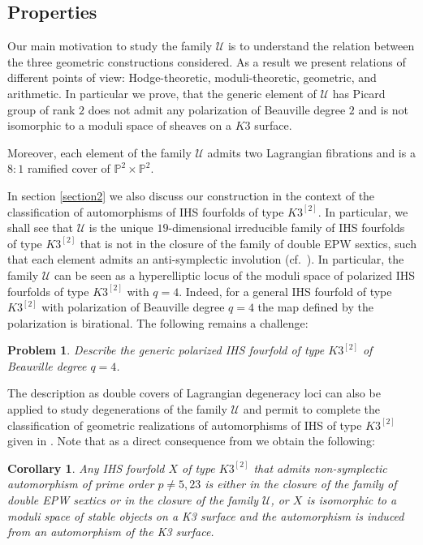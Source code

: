 \documentclass[a4paper,11pt]{amsart}
\newtheorem{cor}[thm]{Corollary}
\newtheorem{prob}[thm]{Problem}
\theoremstyle{definition}
\numberwithin{equation}{section}
\numberwithin{equation}{section} \theoremstyle{definition}
\begin{document}
 \subsection{Properties} Our main motivation to study the family $\mathcal{U}$ is to understand the relation between the three geometric constructions considered. 
As a result we present relations of different points of view: Hodge-theoretic, moduli-theoretic, geometric, and arithmetic.
 In particular we prove, that the generic element of $\mathcal{U}$ has Picard group of rank $2$ does not admit any polarization of Beauville degree $2$ and is not isomorphic to a moduli space of sheaves on a $K3$ surface. 
  
  Moreover, each element of the family $\mathcal{U}$ admits two Lagrangian fibrations and is a $8:1$ ramified cover of ${{\mathbb{P}}}^2\times {{\mathbb{P}}}^2$.

 
  In section \ref{section2} we also discuss our construction in the context of the classification of automorphisms of IHS fourfolds of type $K3^{[2]}$. In particular, we shall see that $\mathcal{U}$ is the unique $19$-dimensional irreducible family of IHS fourfolds of type $K3^{[2]}$ that is not in the closure of the family of double EPW sextics, such that each element admits an anti-symplectic involution (cf.~\cite{OW}). In particular, the family $\mathcal{U}$ can be seen as a hyperelliptic locus of the moduli space of  polarized  IHS fourfolds of type $K3^{[2]}$ with $q=4$. Indeed, for a general IHS fourfold of type $K3^{[2]}$ with polarization of Beauville degree $q=4$ the map defined by the polarization is birational.   The following remains a challenge:
  \begin{prob} Describe the generic polarized IHS fourfold of type $K3^{[2]}$ of Beauville degree $q=4$. 
\end{prob}

The description as  double covers of Lagrangian degeneracy loci can also be applied to study degenerations of the family $\mathcal{U}$ and permit to complete the classification of geometric realizations of automorphisms of IHS of type $K3^{[2]}$ given in \cite{MongardiWandel}.
 Note that as a direct consequence from \cite[\S 5.1]{MongardiWandel} we obtain the following: 
\begin{cor}\label{MongWand} Any IHS fourfold $X$ of type $K3^{[2]}$ that admits non-symplectic automorphism of prime order $p\neq 5,23$ is either in the closure of the family of double EPW sextics
or in the closure of the family $\mathcal{U}$, or $X$ is isomorphic to a moduli space of stable objects on a K3 surface and the automorphism is induced from an automorphism of the K3 surface.
\end{cor}
  
\end{document}
